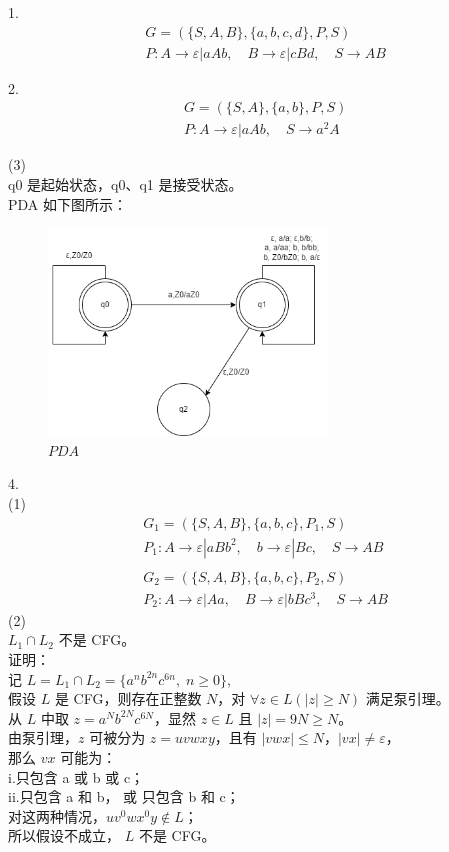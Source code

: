 \documentclass{article}
\begin{document}
1. \\
\[
\begin{aligned}
    & G = (\{S, A, B\}, \{a, b, c, d\}, P, S) \\
    & P: A \rightarrow \varepsilon | aAb,\quad B \rightarrow \varepsilon | cBd, \quad S \rightarrow AB    
\end{aligned}
\]

2. \\
\[
\begin{aligned}
    & G = (\{S, A\}, \{a, b\}, P, S) \\
    & P: A \rightarrow \varepsilon | aAb,\quad S \rightarrow a^2A
\end{aligned}    
\]

(3) \\
q0 是起始状态，q0、q1 是接受状态。\\
PDA 如下图所示：
\begin{figure}[htbp]
	\centering
    \includegraphics[width=20em,height=!]{PDA.png}
	\caption{$PDA$}
\end{figure}

4.\\
(1)\\
\[
\begin{aligned}
    & G_1 = (\{S, A, B\}, \{a, b, c\}, P_1, S) \\
    & P_1: A \rightarrow \varepsilon | aBb^2, \quad b \rightarrow \varepsilon | Bc, \quad S \rightarrow AB \\
    \\
    & G_2 = (\{S, A, B\}, \{a, b, c\}, P_2, S) \\
    & P_2: A \rightarrow \varepsilon | Aa, \quad B \rightarrow \varepsilon | bBc^3,\quad S \rightarrow AB
\end{aligned}    
\]
(2)\\
$L_1 \cap L_2$ 不是 CFG。 \\
证明：\\
记 $L = L_1 \cap L_2 = \{a^nb^{2n}c^{6n},\; n \geq 0\}$, \\
假设 $L$ 是 CFG，则存在正整数 $N$，对 $\forall z \in L (|z| \geq N)$ 满足泵引理。 \\
从 $L$ 中取 $z = a^Nb^{2N}c^{6N}$，显然 $z \in L$ 且 $|z| = 9N \geq N$。 \\
由泵引理，$z$ 可被分为 $z = uvwxy$，且有 $|vwx| \leq N$，$|vx| \neq \varepsilon$，\\
那么 $vx$ 可能为：\\
i.只包含 a 或 b 或 c； \\
ii.只包含 a 和 b， 或 只包含 b 和 c； \\
对这两种情况，$uv^0wx^0y \notin L$；\\
所以假设不成立， $L$ 不是 CFG。\\
\end{document}
